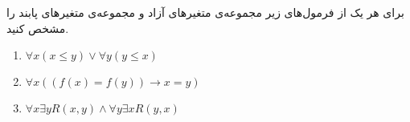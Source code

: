 برای هر یک از فرمول‌های زیر مجموعه‌ی متغیرهای آزاد و مجموعه‌ی متغیرهای پابند را مشخص کنید.
\begin{enumerate}[label=\alph*]
  \item $\forall x (x \leq y) \vee \forall y (y \leq x)$
  \item $\forall x ((f(x) = f(y)) \rightarrow x = y)$
  \item $\forall x \exists y R(x, y) \wedge \forall y \exists x R(y, x)$
\end{enumerate}
